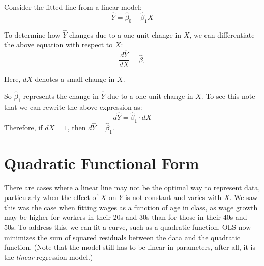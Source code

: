 \documentclass{./../../Latex/handout}
\begin{document}
\thispagestyle{plain}

Consider the fitted line from a linear model:
 $$ \hat{Y} = \hat{\beta}_0 + \hat{\beta}_1 X $$
 
To determine how $\hat{Y}$ changes due to a one-unit change in $X$, we can differentiate the above equation with respect to $X$:
  $$ \frac{d\hat{Y}}{d X} =  \hat{\beta}_1 $$

Here, $d X$ denotes a small change in $X$.

So $\hat{\beta}_1$ represents the change in $\hat{Y}$ due to a one-unit change in $X$. To see this note that we can rewrite the above expression as:
 $$d\hat{Y}=  \hat{\beta}_1 \cdot dX$$
Therefore, if $dX=1$, then $d\hat{Y}= \hat{\beta}_1$. \\


\section{Quadratic Functional Form}
 
There are cases where a linear line may not be the optimal way to represent data, particularly when the effect of $X$ on $Y$ is not constant and varies with $X$. We saw this was the case when fitting wages as a function of age in class, as wage growth may be higher for workers in their 20s and 30s than for those in their 40s and 50s. To address this, we can fit a curve, such as a quadratic function.  OLS now minimizes the sum of squared residuals between the data and the quadratic function. (Note that the model still has to be linear in parameters, after all, it is the \textit{linear} regression model.)
\end{document}

